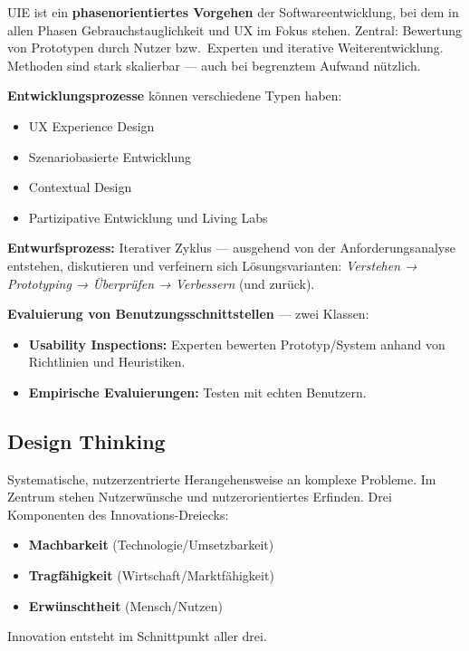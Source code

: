 \documentclass[12pt, a4paper]{article}
\begin{document}
UIE ist ein \textbf{phasenorientiertes Vorgehen} der Softwareentwicklung, bei dem in allen Phasen Gebrauchstauglichkeit und UX im Fokus stehen. Zentral: Bewertung von Prototypen durch Nutzer bzw.\ Experten und iterative Weiterentwicklung. Methoden sind stark skalierbar — auch bei begrenztem Aufwand nützlich.

\textbf{Entwicklungsprozesse} können verschiedene Typen haben:
\begin{itemize}
  \item UX Experience Design
  \item Szenariobasierte Entwicklung
  \item Contextual Design
  \item Partizipative Entwicklung und Living Labs
\end{itemize}

\textbf{Entwurfsprozess:} Iterativer Zyklus — ausgehend von der Anforderungsanalyse entstehen, diskutieren und verfeinern sich Lösungsvarianten:
\textit{Verstehen → Prototyping → Überprüfen → Verbessern} (und zurück).

\textbf{Evaluierung von Benutzungsschnittstellen} — zwei Klassen:
\begin{itemize}
  \item \textbf{Usability Inspections:} Experten bewerten Prototyp/System anhand von Richtlinien und Heuristiken.
  \item \textbf{Empirische Evaluierungen:} Testen mit echten Benutzern.
\end{itemize}

\subsection{Design Thinking}

Systematische, nutzerzentrierte Herangehensweise an komplexe Probleme. Im Zentrum stehen Nutzerwünsche und nutzerorientiertes Erfinden. Drei Komponenten des Innovations-Dreiecks:
\begin{itemize}
  \item \textbf{Machbarkeit} (Technologie/Umsetzbarkeit)
  \item \textbf{Tragfähigkeit} (Wirtschaft/Marktfähigkeit)
  \item \textbf{Erwünschtheit} (Mensch/Nutzen)
\end{itemize}

Innovation entsteht im Schnittpunkt aller drei.
\end{document}
